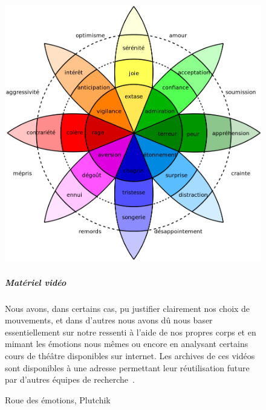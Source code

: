                 \begin{figure}[!h]
                \begin{minipage}{0.375\linewidth}
                      \includegraphics[width=\linewidth]{Figures/EmoModel.png}
                      \caption{Roue des émotions, Plutchik~}\label{fig:EmoModel}
                \end{minipage}
                \hfill
                \begin{minipage}{0.6\linewidth}
                \myDefautStyle
                \subparagraph{Matériel vidéo}
                    Nous avons, dans certains cas, pu justifier clairement nos choix de mouvements, et dans d’autres nous avons dû nous baser essentiellement sur notre ressenti à l’aide de nos propres corps et en mimant les émotions nous mêmes ou encore en analysant certains cours de théâtre disponibles sur internet. Les archives de ces vidéos sont disponibles à une adresse  permettant leur réutilisation future par d'autres équipes de recherche~.\newline\vfill
                \end{minipage}
                \end{figure}\par%
